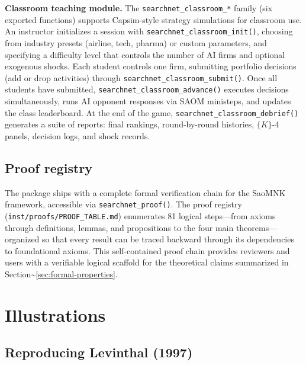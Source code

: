 \documentclass[
]{article}
\begin{document}
\textbf{Classroom teaching module.} The \texttt{searchnet\_classroom\_*}
family (six exported functions) supports Capsim-style strategy
simulations for classroom use. An instructor initializes a session with
\texttt{searchnet\_classroom\_init()}, choosing from industry presets
(airline, tech, pharma) or custom parameters, and specifying a
difficulty level that controls the number of AI firms and optional
exogenous shocks. Each student controls one firm, submitting portfolio
decisions (add or drop activities) through
\texttt{searchnet\_classroom\_submit()}. Once all students have
submitted, \texttt{searchnet\_classroom\_advance()} executes decisions
simultaneously, runs AI opponent responses via SAOM ministeps, and
updates the class leaderboard. At the end of the game,
\texttt{searchnet\_classroom\_debrief()} generates a suite of reports:
final rankings, round-by-round histories, \(\{K\}\)-4 panels, decision
logs, and shock records.

\subsection{Proof registry}\label{sec:proofs}

The package ships with a complete formal verification chain for the
SaoMNK framework, accessible via \texttt{searchnet\_proof()}. The proof
registry (\texttt{inst/proofs/PROOF\_TABLE.md}) enumerates 81 logical
steps---from axioms through definitions, lemmas, and propositions to the
four main theorems---organized so that every result can be traced
backward through its dependencies to foundational axioms. This
self-contained proof chain provides reviewers and users with a
verifiable logical scaffold for the theoretical claims summarized in
Section\textasciitilde{}\ref{sec:formal-properties}.

\section{Illustrations}\label{sec:illustrations}

\subsection{Reproducing Levinthal (1997)}\label{sec:levinthal}
\end{document}
